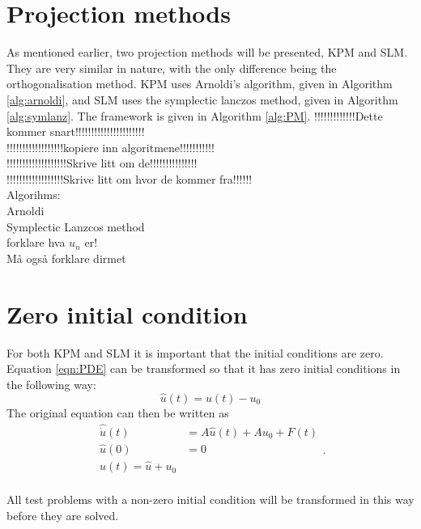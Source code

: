 \section{Projection methods}
As mentioned earlier, two projection methods will be presented, KPM and SLM. They are very similar in nature, with the only difference being the orthogonalisation method. KPM uses Arnoldi's algorithm, given in Algorithm \ref{alg:arnoldi}, and SLM uses the symplectic lanczos method, given in Algorithm \ref{alg:symlanz}. The framework is given in Algorithm \ref{alg:PM}. 
!!!!!!!!!!!!!Dette kommer snart!!!!!!!!!!!!!!!!!!!!!!\\
!!!!!!!!!!!!!!!!!!kopiere inn algoritmene!!!!!!!!!!!\\
!!!!!!!!!!!!!!!!!!!Skrive litt om de!!!!!!!!!!!!!!!\\
!!!!!!!!!!!!!!!!!!Skrive litt om hvor de kommer fra!!!!!!\\
Algorihms:\\

Arnoldi \\

Symplectic Lanzcos method\\

forklare hva $u_n$ er!\\

Må også forklare dirmet\\

\section{Zero initial condition}
For both KPM and SLM it is important that the initial conditions are zero. Equation \eqref{eqn:PDE} can be transformed so that it has zero initial conditions in the following way:
\begin{equation*}
\hat{u}(t) = u(t)-u_0
\end{equation*}
The original equation can then be written as
\begin{equation}
\begin{aligned}
\hat{\dot{u}}(t) &= A \hat{u}(t) +A u_0 + F(t) \\
 \hat{u}(0)&= 0 \\
 u(t) = \hat{u} + u_0 \\
\end{aligned}.
\end{equation}

All test problems with a non-zero initial condition will be transformed in this way before they are solved.

